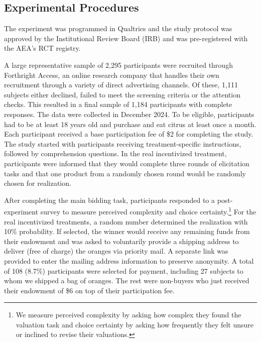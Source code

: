 \documentclass[12pt]{article}
\begin{document}
\subsection{Experimental Procedures}
The experiment was programmed in Qualtrics and the study protocol was approved by the Institutional Review Board (IRB) 
and was pre-registered with the AEA's RCT registry.

A large representative sample of 2,295 participants were recruited through Forthright Access, an online research company that handles their own recruitment through a variety of direct advertising channels. Of these, 1,111 subjects either declined, failed to meet the screening criteria or the attention checks. This resulted in a final sample of 1,184 participants with complete responses. The data were collected in December 2024. To be eligible, participants had to be at least 18 years old and purchase and eat citrus at least once a month. 
Each participant received a base participation fee of \$2 for completing the study. The study started with participants receiving treatment-specific instructions, followed by comprehension questions. In the real incentivized treatment, participants were informed that they would complete three rounds of elicitation tasks and that one product from a randomly chosen round would be randomly chosen for realization. 

After completing the main bidding task, participants responded to a post-experiment survey to measure perceived complexity and choice certainty.\footnote{We measure perceived complexity by asking how complex they found the valuation task and choice certainty by asking how frequently they felt unsure or inclined to revise their valuations.} For the real incentivized treatments, a random number determined the realization with 10\% probability.  If selected, the winner would receive any remaining funds from their endowment and was asked to voluntarily provide a shipping address to deliver (free of charge) the oranges via priority mail. A separate link was provided to enter the mailing address information to preserve anonymity. A total of 108 (8.7\%) participants were selected for payment, including 27 subjects to whom we shipped a bag of oranges. The rest were non-buyers who just received their endowment of \$6 on top of their participation fee. 
\end{document}

